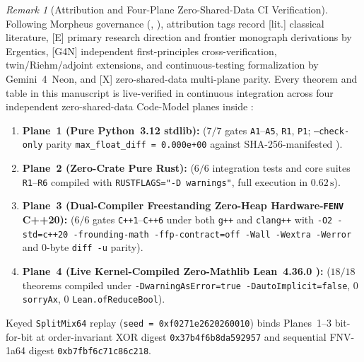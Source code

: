 \documentclass[11pt]{amsart}
\numberwithin{equation}{section}
\theoremstyle{plain}
\theoremstyle{definition}\newtheorem{definition}[theorem]{Definition}
\theoremstyle{remark}\newtheorem{remark}[theorem]{Remark}
\newcommand{\ctag}[1]{\textup{\textsf{\scriptsize[#1]}}}
\begin{document}
\begin{remark}[Attribution and Four-Plane Zero-Shared-Data CI Verification]\label{rem:attribution}
Following Morpheus governance (, ), attribution tags record \ctag{lit.} classical literature, \ctag{E} primary research direction and frontier monograph derivations by Ergentics, \ctag{G4N} independent first-principles cross-verification, twin/Riehm/adjoint extensions, and continuous-testing formalization by Gemini~4~Neon, and \ctag{X} zero-shared-data multi-plane parity. Every theorem and table in this manuscript is live-verified in continuous integration across four independent zero-shared-data Code-Model planes inside :
\begin{enumerate}[label=(\alph*),nosep]
\item \textbf{Plane~1 (Pure Python~3.12 stdlib):}  ($7/7$ gates \texttt{A1}--\texttt{A5}, \texttt{R1}, \texttt{P1}; \texttt{--check-only} parity \texttt{max\_float\_diff = 0.000e+00} against SHA-256-manifested ).
\item \textbf{Plane~2 (Zero-Crate Pure Rust):}  ($6/6$ integration tests and core suites \texttt{R1}--\texttt{R6} compiled with \texttt{RUSTFLAGS="-D warnings"}, full execution in $0.62\,\mathrm{s}$).
\item \textbf{Plane~3 (Dual-Compiler Freestanding Zero-Heap Hardware-\texttt{FENV} C++20):}  ($6/6$ gates \texttt{C++1}--\texttt{C++6} under both \texttt{g++} and \texttt{clang++} with \texttt{-O2 -std=c++20 -frounding-math -ffp-contract=off -Wall -Wextra -Werror} and $0$-byte \texttt{diff -u} parity).
\item \textbf{Plane~4 (Live Kernel-Compiled Zero-Mathlib Lean~4.36.0 \cite{mouraullrich2021}):}  ($18/18$ theorems compiled under \texttt{-DwarningAsError=true -DautoImplicit=false}, $0$ \texttt{sorryAx}, $0$ \texttt{Lean.ofReduceBool}).
\end{enumerate}
Keyed \texttt{SplitMix64} replay (\texttt{seed = 0xf0271e2620260010}) binds Planes~1--3 bit-for-bit at order-invariant XOR digest \texttt{0x37b4f6b8da592957} and sequential FNV-1a64 digest \texttt{0xb7fbf6c71c86c218}.
\end{remark}
\end{document}
